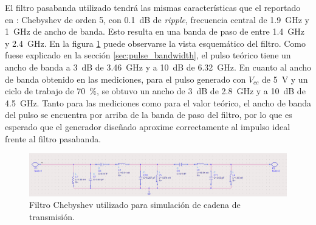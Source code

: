 El filtro pasabanda utilizado tendrá las mismas características que el reportado
en \cite{Altieri2021}: Chebyshev de orden 5, con \qty{0.1}{\dB} de
\textit{ripple}, frecuencia central de \qty{1.9}{\giga\hertz} y
\qty{1}{\giga\hertz} de ancho de banda. Esto resulta en una banda de paso de
entre \qty{1.4}{\giga\hertz} y \qty{2.4}{\giga\hertz}. En la figura
\ref{fig:passband_chebyshev_schematic} puede observarse la vista esquemático del
filtro. Como fuese explicado en la sección \ref{sec:pulse_bandwidth}, el pulso
teórico tiene un ancho de banda a \qty{3}{\dB} de \qty{3.46}{\giga\hertz} y a
\qty{10}{\dB} de \qty{6.32}{\giga\hertz}. En cuanto al ancho de banda obtenido
en las mediciones, para el pulso generado con $V_{cc}$ de \qty{5}{\volt} y un
ciclo de trabajo de \qty{70}{\percent}, se obtuvo un ancho de \qty{3}{\dB} de
\qty{2.8}{\giga\hertz} y a \qty{10}{\dB} de \qty{4.5}{\giga\hertz}. Tanto para
las mediciones como para el valor teórico, el ancho de banda del pulso se
encuentra por arriba de la banda de paso del filtro, por lo que es esperado que
el generador diseñado aproxime correctamente al impulso ideal frente al filtro
pasabanda.

\begin{figure}[t]
    \centering
    \includegraphics[width=\linewidth]{images/passband_chebyshev_schematic.png}
    \caption{Filtro Chebyshev utilizado para simulación de cadena de
    transmisión.}
    \label{fig:passband_chebyshev_schematic}
\end{figure}

